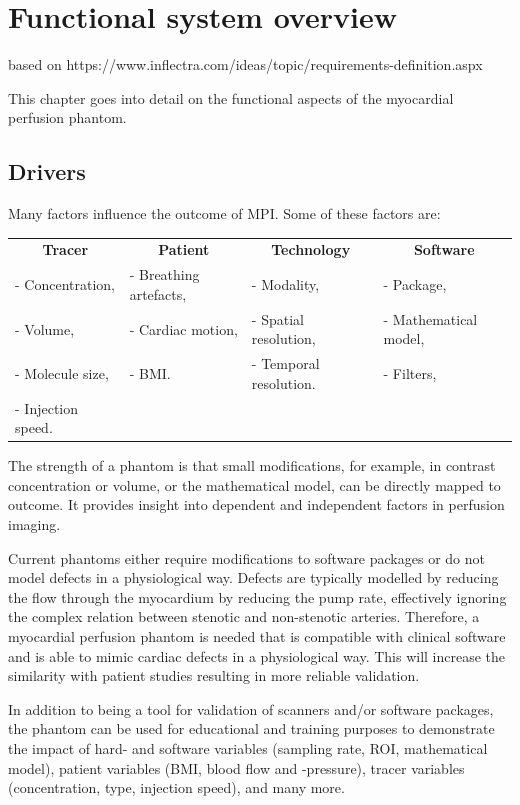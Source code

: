 \chapter{Functional system overview}
based on https://www.inflectra.com/ideas/topic/requirements-definition.aspx

This chapter goes into detail on the functional aspects of the myocardial perfusion phantom.
\section{Drivers}
\label{sec:drivers}
Many factors influence the outcome of \ac{MPI}. Some of these factors are:

\begin{tabular}{llll}
 	\multicolumn{1}{c}{\textbf{Tracer}} & \multicolumn{1}{c}{\textbf{Patient}} & \multicolumn{1}{c}{\textbf{Technology}} & \multicolumn{1}{c}{\textbf{Software}} \\
		- Concentration, & - Breathing artefacts, & - Modality, & - Package, \\
		- Volume, & - Cardiac motion, &  - Spatial resolution, & - Mathematical model, \\
		- Molecule size, & - BMI. & - Temporal resolution. & - Filters,\\
		- Injection speed.  & & & \makecell[l]{- \acs{ROI}.}\\
\end{tabular}

The strength of a phantom is that small modifications, for example, in contrast concentration or volume, or the mathematical model,  can be directly mapped to outcome. It provides insight into dependent and independent factors in perfusion imaging.

Current phantoms either require modifications to software packages or do not model defects in a physiological way. Defects are typically modelled by reducing the flow through the myocardium by reducing the pump rate, effectively ignoring the complex relation between stenotic and non-stenotic arteries. Therefore, a myocardial perfusion phantom is needed that is compatible with clinical software and is able to mimic cardiac defects in a physiological way. This will increase the similarity with patient studies resulting in more reliable validation.

In addition to being a tool for validation of scanners and/or software packages, the phantom can be used for educational and training purposes to demonstrate the impact of hard- and software variables (sampling rate, \acf{ROI}, mathematical model), patient variables (BMI, blood flow and -pressure), tracer variables (concentration, type, injection speed), and many more.

